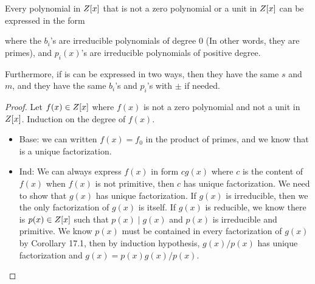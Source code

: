 \documentclass[../main.tex]{subfiles}
\begin{document}
\begin{theorem}
  Every polynomial in $Z[x]$ that is not a zero polynomial or a unit
  in $Z[x]$ can be expressed in the form
  \begin{center}
  \end{center}
  where the $b_i$'s are irreducible polynomials of degree 0
  (In other words, they are primes),
  and $p_i(x)$'s are irreducible polynomials of positive degree.

  Furthermore, if is can be expressed in two ways, then they have the same $s$ and $m$,
  and they have the same $b_i$'s and $p_i$'s with $\pm$ if needed.
\end{theorem}
\begin{proof}
  Let $f(x) \in Z[x]$ where $f(x)$ is not a zero polynomial and not
  a unit in $Z[x]$. Induction on the degree of $f(x)$.
  \begin{itemize}
    \item Base: we can written $f(x) = f_0$ in the product of primes,
          and we know that is a unique factorization.
    \item Ind: We can always express $f(x)$ in form $cg(x)$ where $c$ is the content of $f(x)$
          when $f(x)$ is not primitive, then $c$ has unique factorization.
          We need to show that $g(x)$ has unique factorization.
          If $g(x)$ is irreducible, then we the only factorization of $g(x)$ is itself.
          If $g(x)$ is reducible, we know there is $p(x) \in Z[x]$ such that
          $p(x) \mid g(x)$ and $p(x)$ is irreducible and primitive.
          We know $p(x)$ must be contained in every factorization of $g(x)$ 
          by Corollary 17.1, then by induction hypothesis, $g(x)/p(x)$ has unique factorization
          and $g(x) = p(x) g(x)/p(x)$.
  \end{itemize}
\end{proof}
\end{document}
